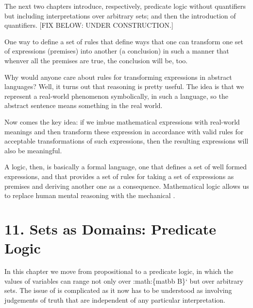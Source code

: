 \documentclass[letterpaper,10pt,english]{sphinxmanual}
\begin{document}
The next two chapters introduce, respectively, predicate logic without
quantifiers but including interpretations over arbitrary sets; and then
the introduction of quantifiers.
{[}FIX BELOW: UNDER CONSTRUCTION.{]}

One way to define a set of  rules that define ways that one
can transform one set of expressions (premises) into another (a
conclusion) in such a manner that whenver all the premises are true,
the conclusion will be, too.

Why would anyone care about rules for transforming expressions in
abstract languages? Well, it turns out that  reasoning is
pretty useful. The idea is that we represent a real-world phenomenon
symbolically, in such a language, so the abstract sentence means
something in the real world.

Now comes the key idea: if we imbue mathematical expressions with
real-world meanings and then transform these expression in accordance
with valid rules for acceptable transformations of such expressions,
then the resulting expressions will also be meaningful.

A logic, then, is basically a formal language, one that defines a set
of well formed expressions, and that provides a set of 
rules for taking a set of expressions as premises and deriving another
one as a consequence. Mathematical logic allows us to replace human
mental reasoning with the mechanical .


\chapter{11. Sets as Domains: Predicate Logic}
\label{\detokenize{11-predicate-logic::doc}}\label{\detokenize{11-predicate-logic:sets-as-domains-predicate-logic}}
In this chapter we move from propositional to a predicate logic, in
which the values of variables can range not only over :math:\{matbb
B\}{}` but over arbitrary sets. The issue of  is complicated as
it now has to be understood as involving judgements of truth that are
independent of any particular interpretation.
\end{document}
